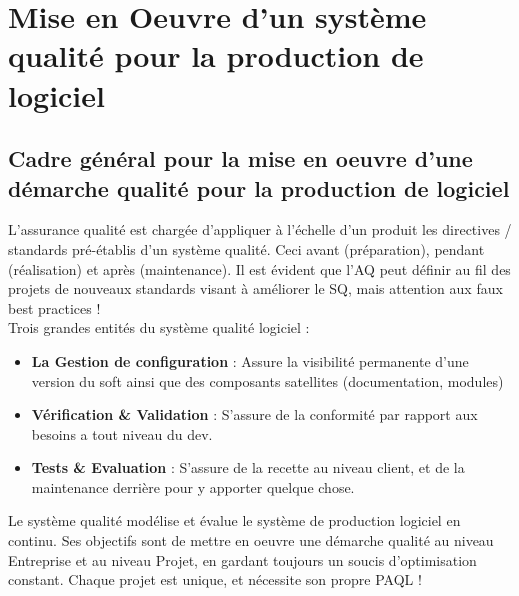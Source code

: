 \chapter{Mise en Oeuvre d’un système qualité pour la production de logiciel} 

\section{Cadre général pour la mise en oeuvre d’une démarche qualité pour la production de logiciel}

L’assurance qualité est chargée d’appliquer à l’échelle d’un produit les directives / standards pré-établis d’un système qualité. Ceci avant (préparation), pendant (réalisation) et après (maintenance).
Il est évident que l’AQ peut définir au fil des projets de nouveaux standards visant à améliorer le SQ, mais attention aux faux best practices ! \\

Trois grandes entités du système qualité logiciel :\\
\begin{itemize}
\item \textbf{La Gestion de configuration} : Assure la visibilité permanente d’une version du soft ainsi que des composants satellites (documentation, modules)
\item \textbf{Vérification \& Validation}  : S’assure de la conformité par rapport aux besoins a tout niveau du dev.
\item \textbf{Tests \& Evaluation} :  S’assure de la recette au niveau client, et de la maintenance derrière pour y apporter quelque chose.
\end{itemize}


Le système qualité modélise et évalue le système de production logiciel en continu. 
Ses objectifs sont de mettre en oeuvre une démarche qualité au niveau Entreprise et au niveau Projet, en gardant toujours un soucis d’optimisation constant.
Chaque projet est unique, et nécessite son propre PAQL !\\

